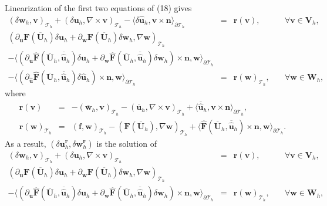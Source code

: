 \documentclass[11pt]{article}
\begin{document}
Linearization of the first two equations of (18) gives
\begin{equation}
\begin{array}{rcll}
(\delta \bm{w}_h, \bm{v})_{\mathcal{T}_h} + (\delta \bm{u}_h, \nabla \times \bm{v})_{\mathcal{T}_h} - \langle \delta \widehat{\bm{u}}_h, \bm{v} \times \bm{n} \rangle_{\partial \mathcal{T}_h}  & = & \bm{r}(\bm{v}), & \quad \forall \bm{v} \in \bm{V}_h, \\[2ex] 
(\partial_{\bm{u}} \bm{F} (\overline{\bm{U}}_h) \delta \bm{u}_h + \partial_{\bm{w}} \bm{F} (\overline{\bm{U}}_h) \delta \bm{w}_h, \nabla \bm{w})_{\mathcal{T}_h} & & \\[2ex]
- \langle (\partial_{\bm{u}} \widehat{\bm{F}} (\overline{\bm{U}}_h,\overline{\widehat{\bm{u}}}_h) \delta \bm{u}_h + \partial_{{\bm{w}}} \widehat{\bm{F}} (\overline{\bm{U}}_h,\overline{\widehat{\bm{u}}}_h) \delta {\bm{w}}_h) \times \bm{n}, \bm{w} \rangle_{\partial \mathcal{T}_h} & & \\[2ex]
 - \langle (\partial_{\widehat{\bm{u}}} \widehat{\bm{F}} (\overline{\bm{U}}_h, \overline{\widehat{\bm{u}}}_h) \delta \widehat{\bm{u}}_h) \times \bm{n}, \bm{w} \rangle_{\partial \mathcal{T}_h}   & = &  \bm{r}(\bm{w})_{\mathcal{T}_h},  & \quad \forall \bm{w} \in \bm{W}_h,
\end{array}
\end{equation}
where
\begin{equation}
\begin{array}{rcl}
 \bm{r}(\bm{v}) & = & -(\overline{\bm{w}}_h, \bm{v})_{\mathcal{T}_h} - (\overline{\bm{u}}_h, \nabla \times \bm{v})_{\mathcal{T}_h} + \langle \overline{\widehat{\bm{u}}}_h, \bm{v} \times \bm{n} \rangle_{\partial \mathcal{T}_h},  \\[2ex]
\bm{r}(\bm{w})_{\mathcal{T}_h} & = & (\bm{f}, \bm{w})_{\mathcal{T}_h} - (\bm{F} (\overline{\bm{U}}_h), \nabla \bm{w})_{\mathcal{T}_h} + \langle \widehat{\bm{F}} (\overline{\bm{U}}_h, \overline{\widehat{\bm{u}}}_h) \times \bm{n}, \bm{w} \rangle_{\partial \mathcal{T}_h} .
\end{array}
\end{equation}
As a result, $(\delta \bm{u}_h^{\bm{r}},\delta \bm{w}_h^{\bm{r}})$ is the solution of
\begin{equation}
\begin{array}{rcll}
(\delta \bm{w}_h, \bm{v})_{\mathcal{T}_h} + (\delta \bm{u}_h, \nabla \times \bm{v})_{\mathcal{T}_h}  & = & \bm{r}(\bm{v}), & \quad \forall \bm{v} \in \bm{V}_h, \\[2ex] 
(\partial_{\bm{u}} \bm{F} (\overline{\bm{U}}_h) \delta \bm{u}_h + \partial_{\bm{w}} \bm{F} (\overline{\bm{U}}_h) \delta \bm{w}_h, \nabla \bm{w})_{\mathcal{T}_h} & & \\[2ex]
- \langle (\partial_{\bm{u}} \widehat{\bm{F}} (\overline{\bm{U}}_h, \overline{\widehat{\bm{u}}}_h) \delta \bm{u}_h + \partial_{{\bm{w}}} \widehat{\bm{F}} (\overline{\bm{U}}_h, \overline{\widehat{\bm{u}}}_h) \delta {\bm{w}}_h) \times \bm{n}, \bm{w} \rangle_{\partial \mathcal{T}_h}  & = &  \bm{r}(\bm{w})_{\mathcal{T}_h},  & \quad \forall \bm{w} \in \bm{W}_h,
\end{array}
\end{equation}
\end{document}
